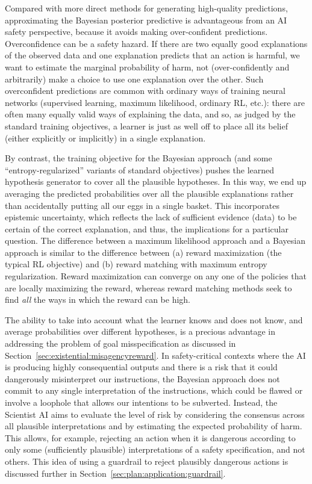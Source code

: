 Compared with more direct methods for generating high-quality predictions, approximating the Bayesian posterior predictive is advantageous from an AI safety perspective, because it avoids making over-confident predictions. 
Overconfidence can be a safety hazard. If there are two equally good explanations of the observed data and one explanation predicts that an action is harmful, we want to estimate the marginal probability of harm, not (over-confidently and arbitrarily) make a choice to use one explanation over the other.
Such overconfident predictions are common with ordinary ways of training neural networks (supervised learning, maximum likelihood, ordinary RL, etc.): there are often many equally valid ways of explaining the data,  and so, as judged by the standard training objectives, a learner is just as well off to place all its belief (either explicitly or implicitly) in a single explanation.

By contrast, the training objective for the Bayesian approach (and some ``entropy-regularized'' variants of standard objectives) pushes the learned hypothesis generator to cover all the plausible hypotheses. In this way, we end up averaging the predicted probabilities over all the plausible explanations rather than accidentally putting all our eggs in a single basket. This incorporates epistemic uncertainty, which reflects the lack of sufficient evidence (data) to be certain of the correct explanation, and thus, the implications for a particular question. The difference between a maximum likelihood approach and a Bayesian approach is similar to the difference between (a) reward maximization (the typical RL objective) and (b) reward matching \cite{arxiv.org.abs.2406.02213} with maximum entropy regularization. Reward maximization can converge on any one of the policies that are locally maximizing the reward, whereas reward matching methods seek to find \emph{all} the ways in which the reward can be high. 

The ability to take into account what the learner knows and does not know, and average probabilities over different hypotheses, is a precious advantage in addressing the problem of goal misspecification as discussed in Section~\ref{sec:existential:misagencyreward}. In safety-critical contexts where the AI is producing highly consequential outputs and there is a risk that it could dangerously misinterpret our instructions, the Bayesian approach does not commit to any single interpretation of the instructions, which could be flawed or involve a loophole that allows our intentions to be subverted. Instead, the Scientist AI aims to evaluate the level of risk by considering the consensus across all plausible interpretations and by estimating the expected probability of harm. This allows, for example, rejecting an action when it is dangerous according to only {some} (sufficiently plausible) interpretations of a safety specification, and not others. This idea of using a guardrail to reject plausibly dangerous actions is discussed further in Section~\ref{sec:plan:application:guardrail}.

